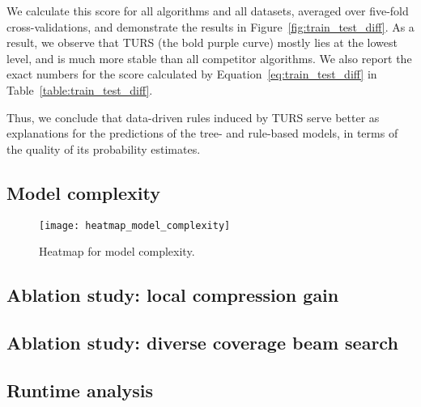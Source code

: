We calculate this score for all algorithms and all datasets, averaged over five-fold cross-validations, and demonstrate the results in Figure~\ref{fig:train_test_diff}. As a result, we observe that TURS (the bold purple curve) mostly lies at the lowest level, and is much more stable than all competitor algorithms. We also report the exact numbers for the score calculated by Equation~\ref{eq:train_test_diff} in Table~\ref{table:train_test_diff}.

Thus, we conclude that data-driven rules induced by TURS serve better as explanations for the predictions of the tree- and rule-based models, in terms of the quality of its probability estimates. 



\subsection{Model complexity}

\begin{figure}
	\texttt{[image: heatmap\_model\_complexity]}
	\caption{Heatmap for model complexity.}	
\end{figure}

\subsection{Ablation study: local compression gain}

\subsection{Ablation study: diverse coverage beam search}

\subsection{Runtime analysis}







